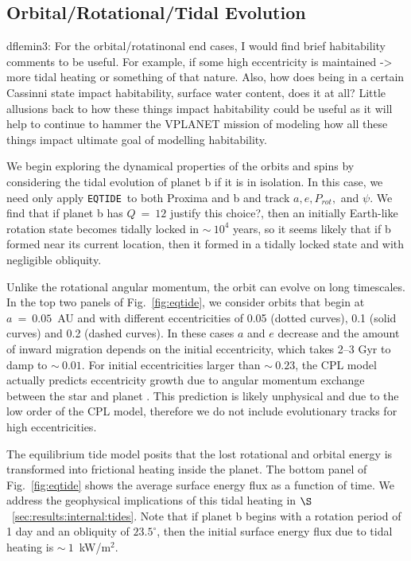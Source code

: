 \documentclass[preprint,12pt]{aastex}
\newcommand{\xxx}[1]{{\color{red} #1}} %
\def\eqtide{\texttt{\footnotesize{EQTIDE}}\xspace}
\begin{document}
\subsection{Orbital/Rotational/Tidal Evolution}
\label{sec:results:orbital}

\xxx{dflemin3: For the orbital/rotatinonal end cases, I would find brief habitability comments to be useful.  For example,
if some high eccentricity is maintained -> more tidal heating or something of that nature.  Also, how does being in a certain
Cassinni state impact habitability, surface water content, does it at all?  Little allusions back to how these things impact
habitability could be useful as it will help to continue to hammer the VPLANET mission of modeling how all these things
impact ultimate goal of modelling habitability.}

We begin exploring the dynamical properties of the orbits and spins by
considering the tidal evolution of planet b if it is in isolation. In
this case, we need only apply \eqtide~to both Proxima and b and track
$a, e, P_{rot},$ and $\psi$. We find that if planet b has $Q~=~12$ \xxx{justify this choice?},
then an initially Earth-like rotation state becomes tidally locked in
$\sim~10^4$ years, so it seems likely that if b formed near its
current location, then it formed in a tidally locked state and with
negligible obliquity.

Unlike the rotational angular momentum, the orbit can evolve on long
timescales. In the top two panels of Fig.~\ref{fig:eqtide}, we
consider orbits that begin at $a~=~0.05$~AU and with different
eccentricities of 0.05 (dotted curves), 0.1 (solid curves) and 0.2
(dashed curves). In these cases $a$ and $e$ decrease and the amount of
inward migration depends on the initial eccentricity, which takes 2--3
Gyr to damp to $\sim~0.01$. For initial eccentricities larger than
$\sim~0.23$, the CPL model actually predicts eccentricity growth due
to angular momentum exchange between the star and planet
\citep{Barnes16}. This prediction is likely unphysical and due to the
low order of the CPL model, therefore we do not include evolutionary
tracks for high eccentricities.

The equilibrium tide model posits that the lost rotational and orbital
energy is transformed into frictional heating inside the planet. The
bottom panel of Fig.~\ref{fig:eqtide} shows the average surface energy
flux as a function of time. We address the geophysical implications of
this tidal heating in $\S$~\ref{sec:results:internal:tides}. Note that if planet
b begins with a rotation period of 1 day and an obliquity of
$23.5^\circ$, then the initial surface energy flux due to tidal
heating is $\sim~1$~kW/m$^{2}$.
\end{document}
